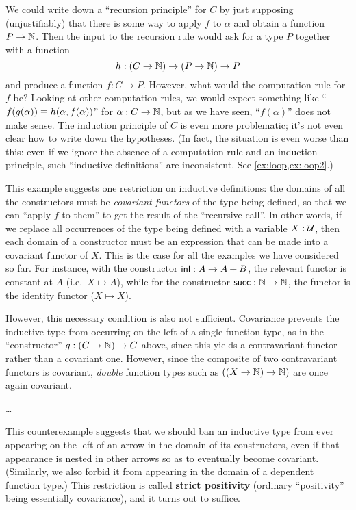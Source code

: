 We could write down a ``recursion principle'' for $C$ by just supposing (unjustifiably) that there is some way to apply $f$ to $\alpha$ and obtain a function $P\to\mathbb{N}$.
Then the input to the recursion rule would ask for a type $P$ together with a function
\[ h:(C\to\mathbb{N}) \to (P\to\mathbb{N}) \to P \]
and produce a function $f:C\to P$.
However, what would the computation rule for $f$ be?
Looking at other computation rules, we would expect something like ``$f(g(\alpha)) \equiv h(\alpha,f(\alpha))$'' for $\alpha:C\to\mathbb{N}$, but as we have seen, ``$f(\alpha)$'' does not make sense.
The induction principle of $C$ is even more problematic; it's not even clear how to write down the hypotheses.
(In fact, the situation is even worse than this: even if we ignore the absence of a computation rule and an induction principle, such ``inductive definitions'' are inconsistent.
See \autoref{ex:loop,ex:loop2}.)

This example suggests one restriction on inductive definitions: the domains of all the constructors must be \emph{covariant functors} of the type being defined, so that we can ``apply $f$ to them'' to get the result of the ``recursive call''.
In other words, if we replace all occurrences of the type being defined with a variable $X:\mathcal{U}$, then each domain of a constructor must be an expression that can be made into a covariant functor of $X$.
This is the case for all the examples we have considered so far.
For instance, with the constructor $\mathsf{inl}:A\to A+B$, the relevant functor is constant at $A$ (i.e.\ $X\mapsto A$), while for the constructor $\mathsf{succ}:\mathbb{N}\to\mathbb{N}$, the functor is the identity functor ($X\mapsto X$).

However, this necessary condition is also not sufficient.
Covariance prevents the inductive type from occurring on the left of a single function type, as in the ``constructor'' $g:(C\to\mathbb{N})\to C$ above, since this yields a contravariant functor rather than a covariant one.
However, since the composite of two contravariant functors is covariant, \emph{double} function types such as $((X\to \mathbb{N})\to \mathbb{N})$ are once again covariant.

\dots

\medskip

This counterexample suggests that we should ban an inductive type from ever appearing on the left of an arrow in the domain of its constructors, even if that appearance is nested in other arrows so as to eventually become covariant.
(Similarly, we also forbid it from appearing in the domain of a dependent function type.)
This restriction is called \textbf{strict positivity} (ordinary ``positivity'' being essentially covariance), and it turns out to suffice.

